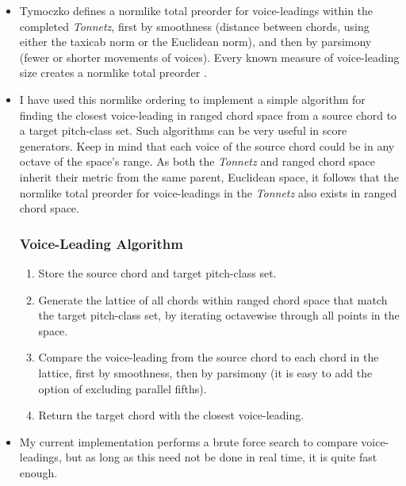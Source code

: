 \documentclass[14pt,letterpaper,onecolumn]{scrartcl}
\begin{document}
\begin{itemize}

\item Tymoczko defines a normlike total preorder for voice-leadings within the completed \emph{Tonnetz}, first by smoothness (distance between chords, using either the taxicab norm or the Euclidean norm), and then by parsimony (fewer or shorter movements of voices). Every known measure of voice-leading size creates a normlike total preorder \cite{geometryofchords}.

\item I have used this normlike ordering to implement a simple algorithm for finding the closest voice-leading in ranged chord space from a source chord to a target pitch-class set. Such algorithms can be very useful in score generators. Keep in mind that each voice of the source chord could be in any octave of the space's range. As both the \emph{Tonnetz} and ranged chord space inherit their metric from the same parent, Euclidean space, it follows that the normlike total preorder for voice-leadings in the \emph{Tonnetz} also exists in ranged chord space.

\subsubsection{Voice-Leading Algorithm}

\begin{enumerate}

\item Store the source chord and target pitch-class set.

\item Generate the lattice of all chords within ranged chord space that match the target pitch-class set, by iterating octavewise through all points in the space.

\item Compare the voice-leading from the source chord to each chord in the lattice, first by smoothness, then by parsimony (it is easy to add the option of excluding parallel fifths). 

\item Return the target chord with the closest voice-leading.

\end{enumerate}

\item My current implementation performs a brute force search to compare voice-leadings, but as long as this need not be done in real time, it is quite fast enough. 

\end{itemize}
\end{document}
